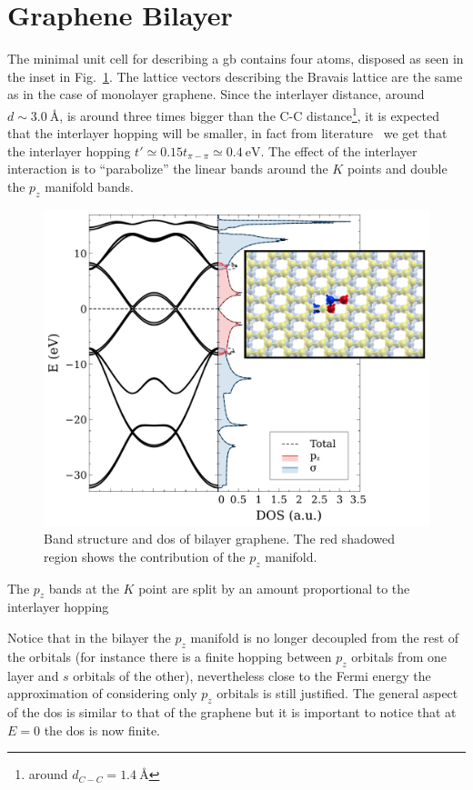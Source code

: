 \section{Graphene Bilayer}
The minimal unit cell for describing a \ac{gb} contains four atoms, disposed as seen in the inset in Fig.~\ref{bilayer}. The lattice vectors describing the Bravais lattice are the same as in the case of monolayer graphene. Since the interlayer distance, around $d \sim \SI{3.0}{\angstrom}$, is  around three times bigger than the C-C distance\footnote{around $d_{C-C} = \SI{1.4}{\angstrom}$}, it is expected that the interlayer hopping will be smaller, in fact from literature~\cite{KatsnelsonBook} we get that the interlayer hopping $t'\simeq 0.15t_{\pi-\pi}\simeq\SI{0.4}{\eV}$. The effect of the interlayer interaction is to ``parabolize'' the linear bands around the $K$ points and double the $p_z$ manifold bands.
\begin{figure}[h!]
\centering
\includegraphics{chapter06/figures/bilayer_bandDOS.pdf}
\vspace{-5pt}
\caption{Band structure and \ac{dos} of bilayer graphene. The red shadowed region shows the contribution of the $p_z$ manifold.}
\label{bilayer}
\end{figure}
\FloatBarrier
The $p_z$ bands at the $K$ point are split by an amount proportional to the interlayer hopping

Notice that in the bilayer the $p_z$ manifold is no longer decoupled from the rest of the orbitals (for instance there is a finite hopping between $p_z$ orbitals from one layer and $s$ orbitals of the other), nevertheless close to the Fermi energy the approximation of considering only $p_z$ orbitals is still justified.
The general aspect of the \ac{dos} is similar to that of the graphene but it is important to notice that at $E=0$ the \ac{dos} is now finite.

